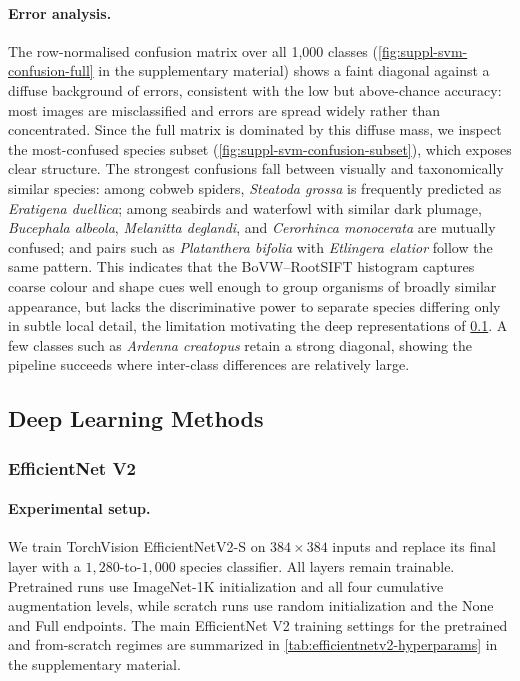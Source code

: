 \paragraph{Error analysis.}
The row-normalised confusion matrix over all 1{,}000 classes (\cref{fig:suppl-svm-confusion-full} in the supplementary material) shows a faint diagonal against a diffuse background of errors, consistent with the low but above-chance accuracy: most images are misclassified and errors are spread widely rather than concentrated. Since the full matrix is dominated by this diffuse mass, we inspect the most-confused species subset (\cref{fig:suppl-svm-confusion-subset}), which exposes clear structure. The strongest confusions fall between visually and taxonomically similar species: among cobweb spiders, \textit{Steatoda grossa} is frequently predicted as \textit{Eratigena duellica}; among seabirds and waterfowl with similar dark plumage, \textit{Bucephala albeola}, \textit{Melanitta deglandi}, and \textit{Cerorhinca monocerata} are mutually confused; and pairs such as \textit{Platanthera bifolia} with \textit{Etlingera elatior} follow the same pattern. This indicates that the BoVW--RootSIFT histogram captures coarse colour and shape cues well enough to group organisms of broadly similar appearance, but lacks the discriminative power to separate species differing only in subtle local detail, the limitation motivating the deep representations of \cref{sec:dl-methods}. A few classes such as \textit{Ardenna creatopus} retain a strong diagonal, showing the pipeline succeeds where inter-class differences are relatively large.

\subsection{Deep Learning Methods}
\label{sec:dl-methods}

\subsubsection{EfficientNet V2}
\label{sec:dl-efficientnetv2}

\paragraph{Experimental setup.}
We train TorchVision EfficientNetV2-S on $384\times384$ inputs and replace its final layer with a $1{,}280$-to-$1{,}000$ species classifier. All layers remain trainable. Pretrained runs use ImageNet-1K initialization and all four cumulative augmentation levels, while scratch runs use random initialization and the None and Full endpoints. The main EfficientNet V2 training settings for the pretrained and from-scratch regimes are summarized in \cref{tab:efficientnetv2-hyperparams} in the supplementary material.


